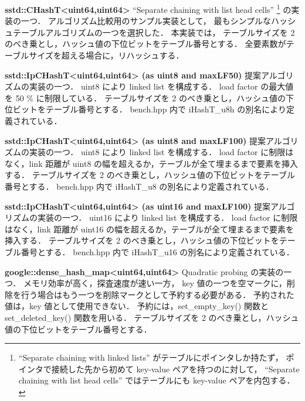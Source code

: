%
{\bf sstd::CHashT<uint64,uint64>}
\samepage\newline\indent
``Separate chaining with list head cells''
\footnote{``Separate chaining with linked lists'' がテーブルにポインタしか持たず，
ポインタで接続した先から初めて key-value ペアを持つのに対して，
``Separate chaining with list head cells'' ではテーブルにも key-value ペアを内包する．} の実装の一つ．
アルゴリズム比較用のサンプル実装として，
最もシンプルなハッシュテーブルアルゴリズムの一つを選択した．
本実装では，
テーブルサイズを 2 のべき乗とし，ハッシュ値の下位ビットをテーブル番号とする．
全要素数がテーブルサイズを超える場合に，リハッシュする．
\leavevmode \newline

%
{\bf sstd::IpCHashT<uint64,uint64> (as uint8 and maxLF50)}
\samepage\newline\indent
提案アルゴリズムの実装の一つ．
uint8 により linked list を構成する．
load factor の最大値を 50 \% に制限している．
テーブルサイズを 2 のべき乗とし，ハッシュ値の下位ビットをテーブル番号とする．
{\rm bench.hpp} 内で {\rm iHashT\_u8h} の別名により定義されている．
\leavevmode \newline

%
{\bf sstd::IpCHashT<uint64,uint64> (as uint8 and maxLF100)}
\samepage\newline\indent
提案アルゴリズムの実装の一つ．
uint8 により linked list を構成する．
load factor に制限はなく，link 距離が uint8 の幅を超えるか，テーブルが全て埋まるまで要素を挿入する．
テーブルサイズを 2 のべき乗とし，ハッシュ値の下位ビットをテーブル番号とする．
{\rm bench.hpp} 内で {\rm iHashT\_u8} の別名により定義されている．
\leavevmode \newline

%
{\bf sstd::IpCHashT<uint64,uint64> (as uint16 and maxLF100)}
\samepage\newline\indent
提案アルゴリズムの実装の一つ．
uint16 により linked list を構成する．
load factor に制限はなく，link 距離が uint16 の幅を超えるか，テーブルが全て埋まるまで要素を挿入する．
テーブルサイズを 2 のべき乗とし，ハッシュ値の下位ビットをテーブル番号とする．
{\rm bench.hpp} 内で {\rm iHashT\_u16} の別名により定義されている．
\leavevmode \newline

%
{\bf google::dense\_hash\_map<uint64,uint64>}
\samepage\newline\indent
Quadratic probing の実装の一つ．
メモリ効率が高く，探査速度が速い一方，
key 値の一つを空マークに，削除を行う場合はもう一つを削除マークとして予約する必要がある．
予約された値は，key 値として使用できない．
予約には，set\_empty\_key() 関数と set\_deleted\_key() 関数を用いる．
テーブルサイズを 2 のべき乗とし，ハッシュ値の下位ビットをテーブル番号とする．
\leavevmode \newline

